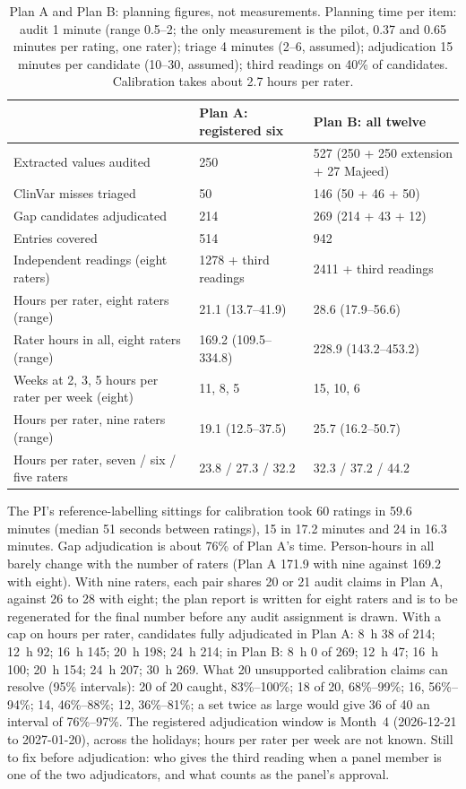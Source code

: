 \documentclass{article} %
\begin{document}
\begin{table}[h]
\caption{Plan A and Plan B: planning figures, not measurements. Planning time per item: audit 1 minute (range 0.5--2; the only measurement is the pilot, 0.37 and 0.65 minutes per rating, one rater); triage 4 minutes (2--6, assumed); adjudication 15 minutes per candidate (10--30, assumed); third readings on 40\% of candidates. Calibration takes about 2.7 hours per rater.}
\begin{center}
\scriptsize
\begin{tabular}{lll}
\toprule
 & Plan A: registered six & Plan B: all twelve \\
\midrule
Extracted values audited & 250 & 527 (250 + 250 extension + 27 Majeed) \\
ClinVar misses triaged & 50 & 146 (50 + 46 + 50) \\
Gap candidates adjudicated & 214 & 269 (214 + 43 + 12) \\
Entries covered & 514 & 942 \\
Independent readings (eight raters) & 1278 + third readings & 2411 + third readings \\
Hours per rater, eight raters (range) & 21.1 (13.7--41.9) & 28.6 (17.9--56.6) \\
Rater hours in all, eight raters (range) & 169.2 (109.5--334.8) & 228.9 (143.2--453.2) \\
Weeks at 2, 3, 5 hours per rater per week (eight) & 11, 8, 5 & 15, 10, 6 \\
Hours per rater, nine raters (range) & 19.1 (12.5--37.5) & 25.7 (16.2--50.7) \\
Hours per rater, seven / six / five raters & 23.8 / 27.3 / 32.2 & 32.3 / 37.2 / 44.2 \\
\bottomrule
\end{tabular}
\end{center}
\end{table}

The PI's reference-labelling sittings for calibration took 60 ratings in 59.6 minutes (median 51 seconds between ratings), 15 in 17.2 minutes and 24 in 16.3 minutes. Gap adjudication is about 76\% of Plan A's time. Person-hours in all barely change with the number of raters (Plan A 171.9 with nine against 169.2 with eight). With nine raters, each pair shares 20 or 21 audit claims in Plan A, against 26 to 28 with eight; the plan report is written for eight raters and is to be regenerated for the final number before any audit assignment is drawn. With a cap on hours per rater, candidates fully adjudicated in Plan A: 8~h 38 of 214; 12~h 92; 16~h 145; 20~h 198; 24~h 214; in Plan B: 8~h 0 of 269; 12~h 47; 16~h 100; 20~h 154; 24~h 207; 30~h 269. What 20 unsupported calibration claims can resolve (95\% intervals): 20 of 20 caught, 83\%--100\%; 18 of 20, 68\%--99\%; 16, 56\%--94\%; 14, 46\%--88\%; 12, 36\%--81\%; a set twice as large would give 36 of 40 an interval of 76\%--97\%. The registered adjudication window is Month~4 (2026-12-21 to 2027-01-20), across the holidays; hours per rater per week are not known. Still to fix before adjudication: who gives the third reading when a panel member is one of the two adjudicators, and what counts as the panel's approval.
\end{document}
